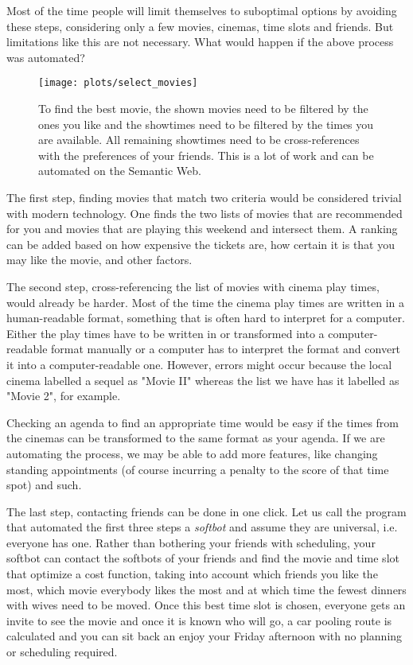 \documentclass{article}
\begin{document}
 Most of the time people will limit themselves to suboptimal options by avoiding these steps, considering only a few movies, cinemas, time slots and friends. But limitations like this are not necessary. What would happen if the above process was automated? 
 
 \begin{figure}
 \centering
 \texttt{[image: plots/select\_movies]}
 \caption{To find the best movie, the shown movies need to be filtered by the ones you like and the showtimes need to be filtered by the times you are available. All remaining showtimes need to be cross-references with the preferences of your friends. This is a lot of work and can be automated on the Semantic Web.}
 \label{movies}
 \end{figure}
 
The first step, finding movies that match two criteria would be considered trivial with modern technology. One finds the two lists of movies that are recommended for you and movies that are playing this weekend and intersect them. A ranking can be added based on how expensive the tickets are, how certain it is that you may like the movie, and other factors. 
 
 The second step, cross-referencing the list of movies with cinema play times, would already be harder. Most of the time the cinema play times are written in a human-readable format, something that is often hard to interpret for a computer. Either the play times have to be written in or transformed into a computer-readable format manually or a computer has to interpret the format and convert it into a computer-readable one. However, errors might occur because the local cinema labelled a sequel as "Movie II" whereas the list we have has it labelled as "Movie 2", for example.
 
 Checking an agenda to find an appropriate time would be easy if the times from the cinemas can be transformed to the same format as your agenda. If we are automating the process, we may be able to add more features, like changing standing appointments (of course incurring a penalty to the score of that time spot) and such.
 
 The last step, contacting friends can be done in one click. Let us call the program that automated the first three steps a \emph{softbot} and assume they are universal, i.e. everyone has one. Rather than bothering your friends with scheduling, your softbot can contact the softbots of your friends and find the movie and time slot that optimize a cost function, taking into account which friends you like the most, which movie everybody likes the most and at which time the fewest dinners with wives need to be moved. Once this best time slot is chosen, everyone gets an invite to see the movie and once it is known who will go, a car pooling route is calculated and you can sit back an enjoy your Friday afternoon with no planning or scheduling required.
 
\end{document}
